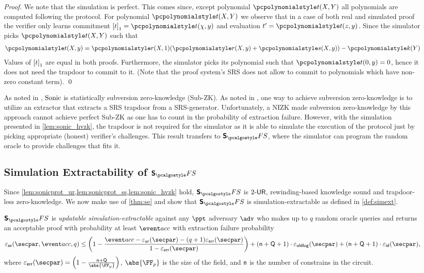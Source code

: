 \begin{proof}
  We note that the simulation is perfect. This comes since, except polynomial
  $\p{t} (X, Y)$ all polynomials are computed following the protocol. For
  polynomial $\p{t} (X, Y)$ we observe that in a case of both real and simulated
  proof the verifier only learns commitment $\gone{t} = \p{t} (\chi, y)$ and
  evaluation $t' = \p{t} (z, y)$. Since the simulator picks $\p{t} (X, Y)$ such
  that 
  \begin{align*}
      \p{t} (X, y) = \p{r} (X, 1) (\p{r}(X, y) + \p{s} (X, y)) - \p{k} (Y)
  \end{align*}
  Values of $\left[t\right]_{1}$ are equal in both proofs.
  Furthermore, the simulator picks its polynomial such that $\p{t}(0, y) = 0$,
  hence it does not need the trapdoor to commit to it. (Note that the proof
  system's SRS does not allow to commit to polynomials which have non-zero
  constant term). \qed
\end{proof}
\begin{remark} 
  As noted in \cite{CCS:MBKM19}, ${\textnormal{{Sonic}}}$ is statistically subversion zero-knowledge (Sub-ZK). As noted in \cite{AC:ABLZ17short}, one way to achieve
  subversion zero-knowledge is to utilize an extractor that extracts a SRS
  trapdoor from a SRS-generator. Unfortunately, a NIZK made subversion
  zero-knowledge by this approach cannot achieve perfect Sub-ZK as one has to
  count in the probability of extraction failure. However, with the simulation
  presented in \cref{lem:sonic_hvzk}, the trapdoor is not required for the
  simulator as it is able to simulate the execution of the protocol just by
  picking appropriate (honest) verifier's challenges. This result transfers to
  $\sonicprotfs$, where the simulator can program the random oracle to provide
  challenges that fits it.
\end{remark}


\subsection{Simulation Extractability of $\sonicprotfs$}
Since \cref{lem:sonicprot_ur,lem:sonicprot_ss,lem:sonic_hvzk} hold, $\sonicprotfs$ is ${2\text{-}\mathsf{UR}}$, rewinding-based knowledge sound and trapdoor-less zero-knowledge. We now make use
of \cref{thm:se} and show that $\sonicprotfs$ is simulation-extractable as defined in \cref{def:simext}.

\begin{corollary}
  \label{thm:sonicprotfs_se}
  $\sonicprotfs$ is \emph{updatable simulation-extractable} against any $\ppt$ adversary $\advse$ who makes up to $q$ random oracle queries and returns an acceptable proof with probability at least $\accProb$ with extraction failure probability 
\[
  \epsse(\secpar, \accProb, q) \leq \left(1 - \frac{\accProb - \epsur (\secpar) - (q + 1) \epserr (\secpar)} {1 - \epserr (\secpar)}\right) + (\multconstr + \linconstr + 1) \cdot \epsuldlog (\secpar) + (\multconstr + \linconstr + 1) \cdot \epsid (\secpar),
\]
where $\epserr (\secpar) = \left(1 - \frac{\multconstr + \linconstr}{\abs{\FF_p}} \right)$, $\abs{\FF_p}$ is the size of the field, and $\mathsf{n}$ is the number of constrains in the circuit. 
\end{corollary}

